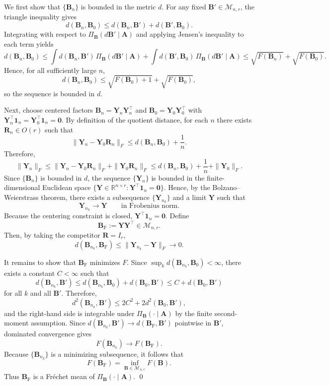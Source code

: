 \documentclass[12pt]{article}
\newcommand{\calMnr}{\mathcal{M}_{n,r}}
\newcommand{\bbR}{\mathbb{R}}
\newcommand{\bfA}{\boldsymbol{A}}
\newcommand{\bfB}{\boldsymbol{B}}
\newcommand{\bfR}{\boldsymbol{R}}
\newcommand{\bfY}{\boldsymbol{Y}}
\newcommand{\bfone}{\boldsymbol{1}}
\newcommand{\bfzero}{\boldsymbol{0}}
\newcommand{\Frechet}{Fr\'{e}chet\xspace}
\newcommand{\BF}{\bfB_{\mathrm{F}}}
\begin{document}
We first show that $\{\bfB_n\}$ is bounded in the metric $d$. For any fixed $\bfB'\in\calMnr$, the
triangle inequality gives
\[
d(\bfB_n,\bfB_0)\le d(\bfB_n,\bfB')+d(\bfB',\bfB_0).
\]
Integrating with respect to $\Pi_{\bfB}(d\bfB'\mid \bfA)$ and applying Jensen's inequality to each
term yields
\[
d(\bfB_n,\bfB_0)
\le
\int d(\bfB_n,\bfB')\,\Pi_{\bfB}(d\bfB'\mid \bfA)
+
\int d(\bfB',\bfB_0)\,\Pi_{\bfB}(d\bfB'\mid \bfA)
\le
\sqrt{F(\bfB_n)}+\sqrt{F(\bfB_0)}.
\]
Hence, for all sufficiently large $n$,
\[
d(\bfB_n,\bfB_0)\le \sqrt{F(\bfB_0)+1}+\sqrt{F(\bfB_0)},
\]
so the sequence is bounded in $d$.

Next, choose centered factors $\bfB_n=\bfY_n\bfY_n^\top$ and $\bfB_0=\bfY_0\bfY_0^\top$ with
$\bfY_n^\top\bfone_n=\bfY_0^\top\bfone_n=\bfzero$. By definition of the quotient distance, for each
$n$ there exists $\bfR_n\in O(r)$ such that
\[
\|\bfY_n-\bfY_0\bfR_n\|_F \le d(\bfB_n,\bfB_0)+\frac{1}{n}.
\]
Therefore,
\[
\|\bfY_n\|_F
\le
\|\bfY_n-\bfY_0\bfR_n\|_F + \|\bfY_0\bfR_n\|_F
\le
d(\bfB_n,\bfB_0)+\frac{1}{n}+\|\bfY_0\|_F.
\]
Since $\{\bfB_n\}$ is bounded in $d$, the sequence $\{\bfY_n\}$ is bounded in the finite-dimensional
Euclidean space $\{\bfY\in\bbR^{n\times r}:\bfY^\top\bfone_n=\bfzero\}$. Hence, by the
Bolzano--Weierstrass theorem, there exists a subsequence $\{\bfY_{n_k}\}$ and a limit $\bfY$ such that
\[
\bfY_{n_k}\to \bfY \qquad\text{in Frobenius norm}.
\]
Because the centering constraint is closed, $\bfY^\top\bfone_n=\bfzero$. Define
\[
\BF:=\bfY\bfY^\top\in\calMnr.
\]
Then, by taking the competitor $\bfR=I_r$,
\[
d(\bfB_{n_k},\BF)
\le
\|\bfY_{n_k}-\bfY\|_F \to 0.
\]

It remains to show that $\BF$ minimizes $F$. Since $\sup_k d(\bfB_{n_k},\bfB_0)<\infty$, there
exists a constant $C<\infty$ such that
\[
d(\bfB_{n_k},\bfB')\le d(\bfB_{n_k},\bfB_0)+d(\bfB_0,\bfB')\le C+d(\bfB_0,\bfB')
\]
for all $k$ and all $\bfB'$. Therefore,
\[
d^2(\bfB_{n_k},\bfB')\le 2C^2+2d^2(\bfB_0,\bfB'),
\]
and the right-hand side is integrable under $\Pi_{\bfB}(\cdot\mid \bfA)$ by the finite
second-moment assumption. Since $d(\bfB_{n_k},\bfB')\to d(\BF,\bfB')$ pointwise in $\bfB'$,
dominated convergence gives
\[
F(\bfB_{n_k}) \to F(\BF).
\]
Because $\{\bfB_{n_k}\}$ is a minimizing subsequence, it follows that
\[
F(\BF)=\inf_{\bfB\in\calMnr} F(\bfB).
\]
Thus $\BF$ is a \Frechet mean of $\Pi_{\bfB}(\cdot\mid \bfA)$.
\qed
\end{document}
